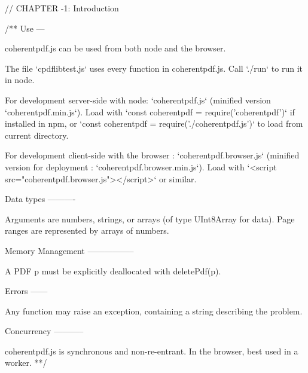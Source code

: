 // CHAPTER -1: Introduction

/**
Use
---

coherentpdf.js can be used from both node and the browser.

The file `cpdflibtest.js` uses every function in coherentpdf.js. Call `./run`
to run it in node.

For development server-side with node: `coherentpdf.js` (minified version
`coherentpdf.min.js`). Load with `const coherentpdf = require('coherentpdf')`
if installed in npm, or `const coherentpdf = require('./coherentpdf.js')` to
load from current directory.

For development client-side with the browser : `coherentpdf.browser.js`
(minified version for deployment : `coherentpdf.browser.min.js`). Load with
`<script src="coherentpdf.browser.js"></script>` or similar.


Data types
----------

Arguments are numbers, strings, or arrays (of type UInt8Array for data). Page
ranges are represented by arrays of numbers.


Memory Management
-----------------

A PDF p must be explicitly deallocated with deletePdf(p).


Errors
------

Any function may raise an exception, containing a string describing the problem. 


Concurrency
-----------

coherentpdf.js is synchronous and non-re-entrant. In the browser, best used in a worker.
**/


